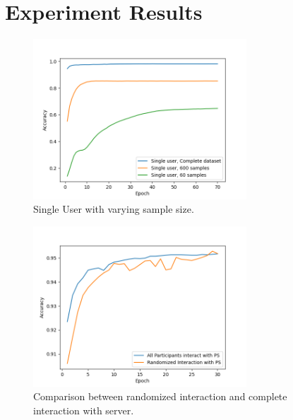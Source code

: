 \documentclass[conference]{IEEEtran}
\begin{document}


\section{Experiment Results}


\centering
\begin{figure}[!h]
\includegraphics[width=8cm, keepaspectratio]{SingleUserBaselines}
\caption{Single User with varying sample size.}
\label{fig:SingleUser}
\end{figure}

\begin{figure}[!h]
\includegraphics[width=8cm, keepaspectratio]{RandomVsAll}
\caption{Comparison between randomized interaction and complete interaction with server. }
\label{fig:RandVsAll}
\end{figure}
\end{document}
